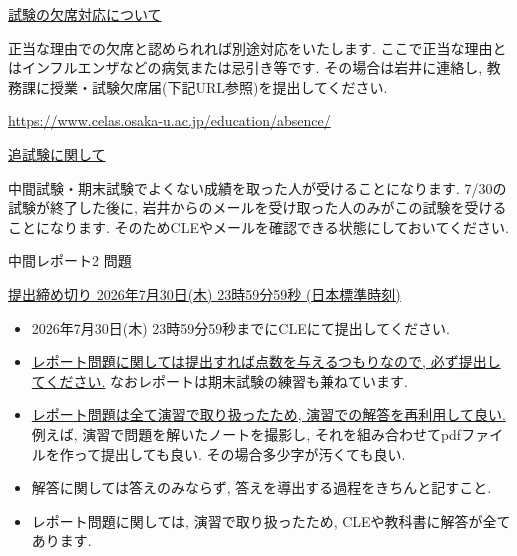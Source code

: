 \documentclass[dvipdfmx,a4paper,11pt]{article} %
\theoremstyle{definition}
\begin{document}
\underline{試験の欠席対応について } 

正当な理由での欠席と認められれば別途対応をいたします. ここで正当な理由とはインフルエンザなどの病気または忌引き等です. その場合は岩井に連絡し, 教務課に授業・試験欠席届(下記URL参照)を提出してください.
\begin{center}
\url{https://www.celas.osaka-u.ac.jp/education/absence/}
\end{center}

\underline{追試験に関して} 

中間試験・期末試験でよくない成績を取った人が受けることになります. 
7/30の試験が終了した後に, 岩井からのメールを受け取った人のみがこの試験を受けることになります. 
そのためCLEやメールを確認できる状態にしておいてください.

\newpage


  \begin{center}
 {\Large 中間レポート2 問題}

{ \large \underline{提出締め切り 2026年7月30日(木) 23時59分59秒 (日本標準時刻)}}
\end{center}


\begin{itemize}
 \setlength{\parskip}{0cm}
  \setlength{\itemsep}{0pt} 
  \item 2026年7月30日(木) 23時59分59秒までにCLEにて提出してください.  
  \item \underline{レポート問題に関しては提出すれば点数を与えるつもりなので, 必ず提出してください.} なおレポートは期末試験の練習も兼ねています. 
  \item \underline{レポート問題は全て演習で取り扱ったため, 演習での解答を再利用して良い.} 例えば, 演習で問題を解いたノートを撮影し, それを組み合わせてpdfファイルを作って提出しても良い. その場合多少字が汚くても良い. 
\item 解答に関しては答えのみならず, 答えを導出する過程をきちんと記すこと. 
\item レポート問題に関しては, 演習で取り扱ったため, CLEや教科書に解答が全てあります. 
\end{itemize}
\end{document}

